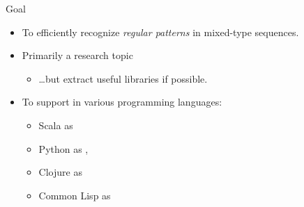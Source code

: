 \begin{frame}{Goal}
  \begin{itemize}
  \item To efficiently recognize \emph{regular patterns} in mixed-type sequences.
  \item Primarily a research topic
    \begin{itemize}
    \item \ldots but extract useful libraries if possible.
    \end{itemize}
  \item To support in various programming languages:
    \begin{itemize}
    \item Scala as 
    \item Python as , 
    \item Clojure as 
    \item Common Lisp as 
    \end{itemize}

  \end{itemize}
\end{frame}
